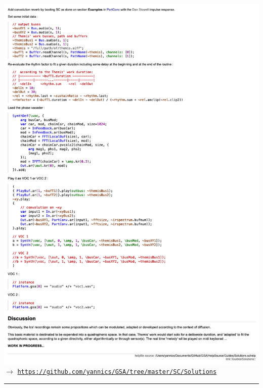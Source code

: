 \includegraphics[width=\textwidth]{mp/img/S2}
%
$\rightarrow$ \href{https://github.com/yannics/GSA/tree/master/SC/Solutions}{\texttt{\small https://github.com/yannics/GSA/tree/master/SC/Solutions}} 
%
\bigskip
%
\begin{center}\rule{0.5\linewidth}{0.5pt}\end{center}
%
\bigskip

